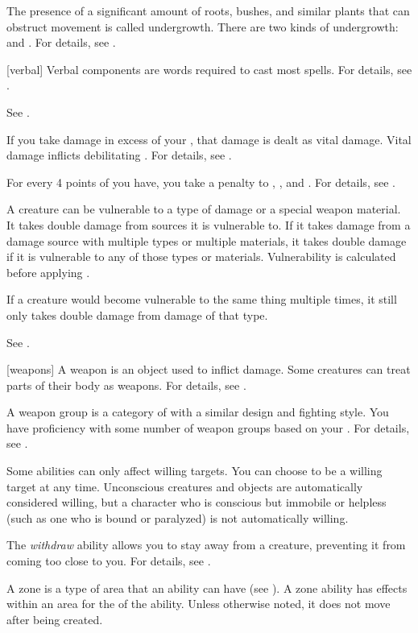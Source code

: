  The presence of a significant amount of roots, bushes, and similar plants that can obstruct movement is called undergrowth.
There are two kinds of undergrowth:  and .
For details, see .

[verbal] Verbal components are words required to cast most spells.
For details, see .

 See .

 If you take damage in excess of your , that damage is dealt as vital damage.
Vital damage inflicts debilitating .
For details, see .

 For every 4 points of  you have, you take a  penalty to , , and .
For details, see .

 A creature can be vulnerable to a type of damage or a special weapon material.
It takes double damage from sources it is vulnerable to.
If it takes damage from a damage source with multiple types or multiple materials, it takes double damage if it is vulnerable to any of those types or materials.
Vulnerability is calculated before applying .
\par If a creature would become vulnerable to the same thing multiple times, it still only takes double damage from damage of that type.

 See .

[weapons] A weapon is an object used to inflict damage.
Some creatures can treat parts of their body as weapons.
For details, see .

 A weapon group is a category of  with a similar design and fighting style.
You have proficiency with some number of weapon groups based on your .
For details, see .

 Some abilities can only affect willing targets. You can choose to be a willing target at any time. Unconscious creatures and objects are automatically considered willing, but a character who is conscious but immobile or helpless (such as one who is bound or paralyzed) is not automatically willing.

 The \textit{withdraw} ability allows you to stay away from a creature, preventing it from coming too close to you.
For details, see .

 A zone is a type of area that an ability can have (see ).
A zone ability has effects within an area for the  of the ability.
Unless otherwise noted, it does not move after being created.
